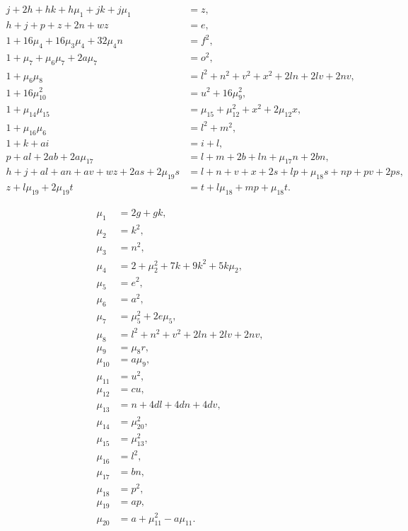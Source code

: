 \begin{align}
  j + 2h + h k + h \mu_{1} + j k + j \mu_{1} &= z,\\
  h + j + p + z + 2n + w z &= e,\\
  1 + 16\mu_{4} + 16\mu_{3} \mu_{4} + 32\mu_{4} n &= f^{2},\\
  1 + \mu_{7} + \mu_{6} \mu_{7} + 2a \mu_{7} &= o^{2},\\
  1 + \mu_{6} \mu_{8} &= l^{2} + n^{2} + v^{2} + x^{2} + 2l n + 2l v + 2n v,\\
  1 + 16\mu_{10}^{2} &= u^{2} + 16\mu_{9}^{2},\\
  1 + \mu_{14} \mu_{15} &= \mu_{15} + \mu_{12}^{2} + x^{2} + 2\mu_{12} x,\\
  1 + \mu_{16} \mu_{6} &= l^{2} + m^{2},\\
  1 + k + a i &= i + l,\\
  p + a l + 2a b + 2a \mu_{17} &= l + m + 2b + l n + \mu_{17} n + 2b n,\\
  h + j + a l + a n + a v + w z + 2a s + 2\mu_{19} s &= l + n + v + x + 2s + l p + \mu_{18} s + n p + p v + 2p s,\\
  z + l \mu_{19} + 2\mu_{19} t &= t + l \mu_{18} + m p + \mu_{18} t.
\end{align}

\begin{align}
  \mu_{1} &= 2g + g k,\\
  \mu_{2} &= k^{2},\\
  \mu_{3} &= n^{2},\\
  \mu_{4} &= 2 + \mu_{2}^{2} + 7k + 9k^{2} + 5k \mu_{2},\\
  \mu_{5} &= e^{2},\\
  \mu_{6} &= a^{2},\\
  \mu_{7} &= \mu_{5}^{2} + 2e \mu_{5},\\
  \mu_{8} &= l^{2} + n^{2} + v^{2} + 2l n + 2l v + 2n v,\\
  \mu_{9} &= \mu_{8} r,\\
  \mu_{10} &= a \mu_{9},\\
  \mu_{11} &= u^{2},\\
  \mu_{12} &= c u,\\
  \mu_{13} &= n + 4d l + 4d n + 4d v,\\
  \mu_{14} &= \mu_{20}^{2},\\
  \mu_{15} &= \mu_{13}^{2},\\
  \mu_{16} &= l^{2},\\
  \mu_{17} &= b n,\\
  \mu_{18} &= p^{2},\\
  \mu_{19} &= a p,\\
  \mu_{20} &= a + \mu_{11}^{2} - a \mu_{11}.
\end{align}


